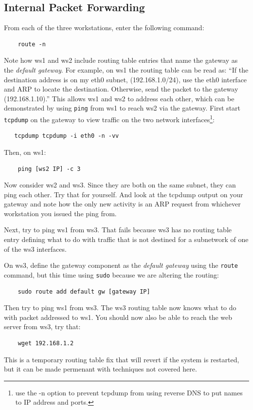 \subsection{Internal Packet Forwarding}
From each of the three workstations, enter the following command:
\begin{verbatim}
    route -n
\end{verbatim}
\noindent Note how ws1 and ws2 include routing table entries that name the
gateway as the \textit{default gateway}.  For example, on ws1 the routing table can be read as:
``If the destination address is on my eth0 subnet, (192.168.1.0/24), use the eth0 interface
and ARP to locate the destination.  Otherwise, send the packet to the gateway (192.168.1.10).'' 
This allows ws1 and ws2 to address each other, which 
can be demonstrated by using \texttt{ping} from ws1 to reach ws2 via the gateway.  First start
{\tt tcpdump} on the gateway to view traffic on the two network interfaces\footnote{use the -n option to prevent tcpdump from
using reverse DNS to put names to IP address and ports.}:   
\begin{verbatim}
   tcpdump tcpdump -i eth0 -n -vv
\end{verbatim}

\noindent Then, on ws1:
\begin{verbatim}
    ping [ws2 IP] -c 3
\end{verbatim}

Now consider ws2 and ws3.  Since they are both on the same subnet, they can ping
each other.  Try that for yourself. And look at the tcpdump output on your gateway
and note how the only new activity is an ARP request from whichever workstation you
issued the ping from. 

Next, try to ping ws1 from ws3.  That fails because ws3 has no routing table entry defining what to do with traffic 
that is not destined for a subnetwork of one of the ws3 interfaces.

On ws3, define the gateway component as the \textit{default gateway} using the 
\texttt{route} command, but this time using \texttt{sudo} because we are altering the routing:

\begin{verbatim}
    sudo route add default gw [gateway IP]
\end{verbatim}
\noindent Then try to ping ws1 from ws3.  The ws3 routing table now knows what
to do with packet addressed to ws1.  You should now also be able to reach the web server
from ws3, try that:
\begin{verbatim}
    wget 192.168.1.2
\end{verbatim}  
This is a temporary routing table fix that will revert if the
system is restarted, but it can be made permenant with techniques not covered here.

